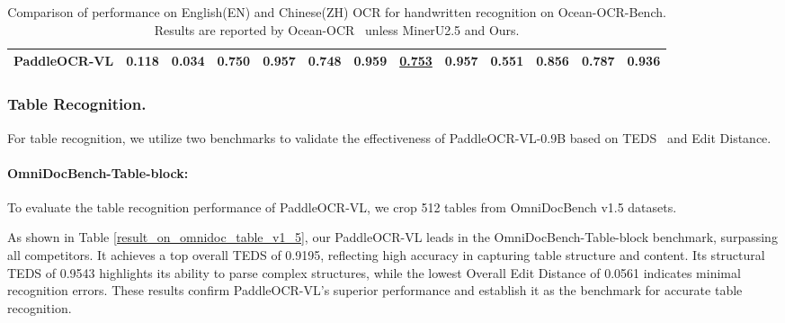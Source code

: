 \documentclass[11pt, a4paper,logo,  copyright, nonumbering]{paddleocr}
\begin{document}
\begin{table}[H]
\begin{tabular}{l|cc|cc|cc|cc|cc|cc}
         \textbf{PaddleOCR-VL} & \cellcolor{red!15}\textbf {0.118} & \cellcolor{red!15}\textbf {0.034} & 0.750 & \cellcolor{red!15}\textbf {0.957} & 0.748 & \cellcolor{red!15}\textbf {0.959} &  \cellcolor{cyan!15}\underline{0.753} & \cellcolor{red!15}\textbf {0.957} & \cellcolor{red!15}\textbf {0.551} &\cellcolor{red!15}\textbf { 0.856} &\cellcolor{red!15}\textbf { 0.787} & \cellcolor{red!15}\textbf {0.936} \\
        \bottomrule
    \end{tabular}
   \caption{Comparison of performance on English(EN) and Chinese(ZH) OCR for handwritten recognition on Ocean-OCR-Bench. Results are reported by Ocean-OCR~\cite{chen2025ocean} unless MinerU2.5 and Ours.}
   \label{table:handwritten_ocr}
\end{table}






\subsubsection{Table Recognition.} For table recognition, we utilize two benchmarks to validate the effectiveness of PaddleOCR-VL-0.9B based on TEDS~\cite{teds} and Edit Distance.

\paragraph{OmniDocBench-Table-block:} To evaluate the table recognition performance of PaddleOCR-VL, we crop 512 tables from OmniDocBench v1.5 datasets. 

As shown in Table \ref{result_on_omnidoc_table_v1_5}, our PaddleOCR-VL leads in the OmniDocBench-Table-block benchmark, surpassing all competitors. It achieves a top overall TEDS of 0.9195, reflecting high accuracy in capturing table structure and content. Its structural TEDS of 0.9543 highlights its ability to parse complex structures, while the lowest Overall Edit Distance of 0.0561 indicates minimal recognition errors. These results confirm PaddleOCR-VL's superior performance and establish it as the benchmark for accurate table recognition.
\end{document}
